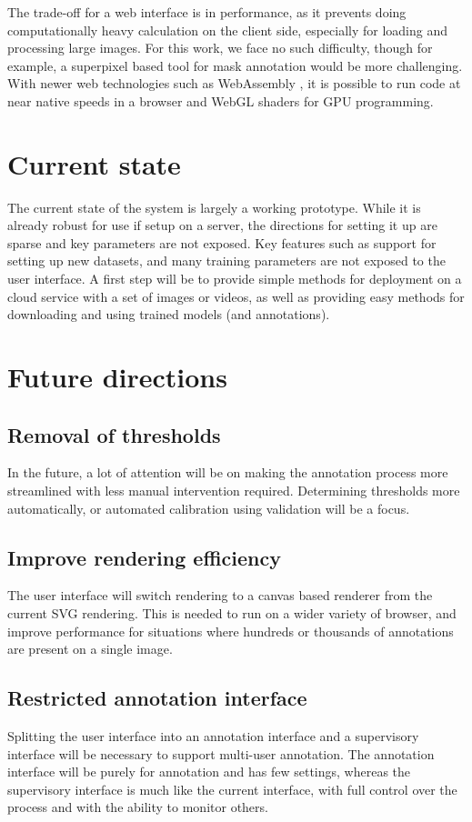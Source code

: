 The trade-off for a web interface is in performance, as it prevents doing computationally heavy calculation on the client side, especially for loading and processing large images. For this work, we face no such difficulty, though for example, a superpixel based tool for mask annotation would be more challenging. With newer web technologies such as WebAssembly \cite{Haas2017}, it is possible to run code at near native speeds in a browser and WebGL shaders for GPU programming.

\section{Current state}
\label{sec:current_state}

The current state of the system is largely a working prototype. While it is already robust for use if setup on a server, the directions for setting it up are sparse and key parameters are not exposed. Key features such as support for setting up new datasets, and many training parameters are not exposed to the user interface. A first step will be to provide simple methods for deployment on a cloud service with a set of images or videos, as well as providing easy methods for downloading and using trained models (and annotations).

\section{Future directions}
\label{sec:design_future_direction}

\subsection {Removal of thresholds}
In the future, a lot of attention will be on making the annotation process more streamlined with less manual intervention required. Determining thresholds more automatically, or automated calibration using validation will be a focus.

\subsection {Improve rendering efficiency}
The user interface will switch rendering to a canvas based renderer from the current SVG rendering. This is needed to run on a wider variety of browser, and improve performance for situations where hundreds or thousands of annotations are present on a single image.

\subsection {Restricted annotation interface}
Splitting the user interface into an annotation interface and a supervisory interface will be necessary to support multi-user annotation. The annotation interface will be purely for annotation and has few settings, whereas the supervisory interface is much like the current interface, with full control over the process and with the ability to monitor others.


